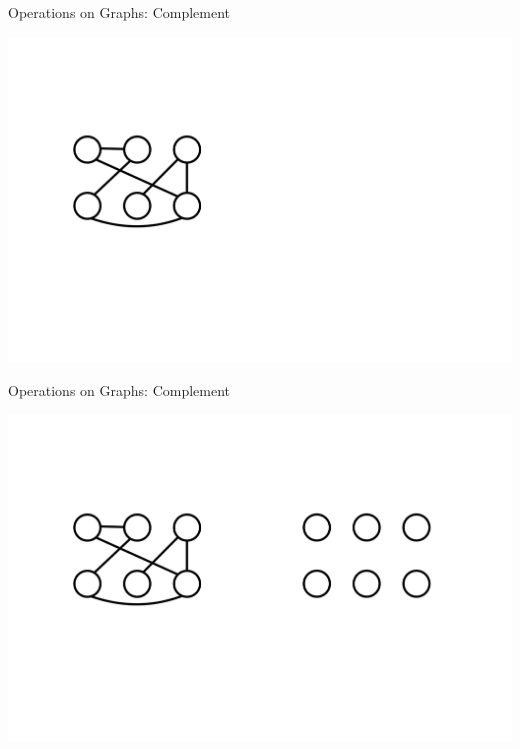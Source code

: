 \documentclass[aspectratio=169]{beamer}
\begin{document}
\begin{frame}{Operations on Graphs: Complement}
    \begin{center}
        \includegraphics[width=1.0\textwidth]{images/output-15-0.jpg}
    \end{center}
\end{frame}

\begin{frame}{Operations on Graphs: Complement}
    \begin{center}
        \includegraphics[width=1.0\textwidth]{images/output-16-0.jpg}
    \end{center}
\end{frame}
\end{document}
